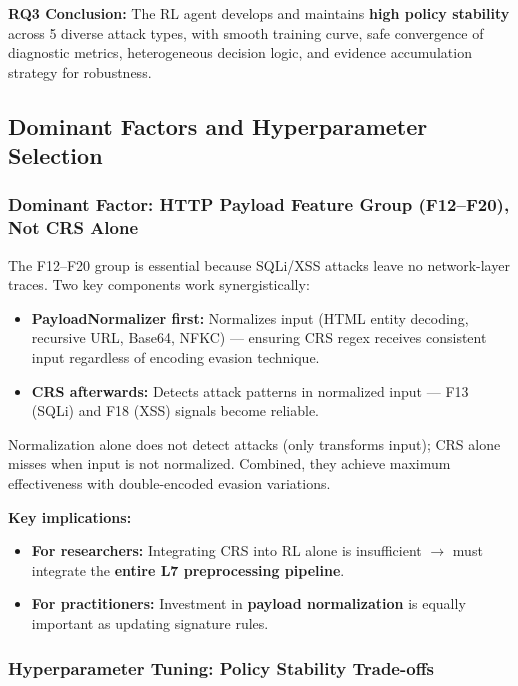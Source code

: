 \documentclass[12pt,a4paper]{report}
\begin{document}
\textbf{RQ3 Conclusion:} The RL agent develops and maintains \textbf{high policy stability} across 5 diverse attack types, with smooth training curve, safe convergence of diagnostic metrics, heterogeneous decision logic, and evidence accumulation strategy for robustness.

\subsection{Dominant Factors and Hyperparameter Selection}

\subsubsection{Dominant Factor: HTTP Payload Feature Group (F12--F20), Not CRS Alone}

The F12--F20 group is essential because SQLi/XSS attacks leave no network-layer traces. Two key components work synergistically:

\begin{itemize}
  \item \textbf{PayloadNormalizer first:} Normalizes input (HTML entity decoding, recursive URL, Base64, NFKC) --- ensuring CRS regex receives consistent input regardless of encoding evasion technique.
  \item \textbf{CRS afterwards:} Detects attack patterns in normalized input --- F13 (SQLi) and F18 (XSS) signals become reliable.
\end{itemize}

Normalization alone does not detect attacks (only transforms input); CRS alone misses when input is not normalized. Combined, they achieve maximum effectiveness with double-encoded evasion variations.

\textbf{Key implications:}
\begin{itemize}
  \item \textbf{For researchers:} Integrating CRS into RL alone is insufficient $\to$ must integrate the \textbf{entire L7 preprocessing pipeline}.
  \item \textbf{For practitioners:} Investment in \textbf{payload normalization} is equally important as updating signature rules.
\end{itemize}

\subsubsection{Hyperparameter Tuning: Policy Stability Trade-offs}
\end{document}

